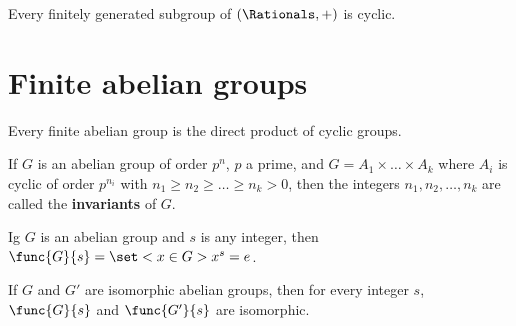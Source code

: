 \begin{proposition}
    Every finitely generated subgroup of \((\Rationals,+)\) is cyclic.
\end{proposition}




\section{Finite abelian groups}

\begin{theorem}
    Every finite abelian group is the direct product of cyclic groups.
\end{theorem}

\begin{definition}
    If \(G\) is an abelian group of order \(p^n\), \(p\) a prime, and \(G = A_1 \times \dots \times A_k\) where \(A_i\) is cyclic of order \(p^{n_i}\) with \(n_1 \geq n_2 \geq \dots \geq n_k > 0\), then the integers \(n_1,n_2, \dots ,n_k\) are called the \textbf{invariants} of \(G\).
\end{definition}

\begin{definition}
    Ig \(G\) is an abelian group and \(s\) is any integer, then \(\func{G}{s} = \set<x \in G>{x^s = e}\).
\end{definition}

\begin{lemma}
    If \(G\) and \(G'\) are isomorphic abelian groups, then for every integer \(s\), \(\func{G}{s}\) and \(\func{G'}{s}\) are isomorphic.
\end{lemma}